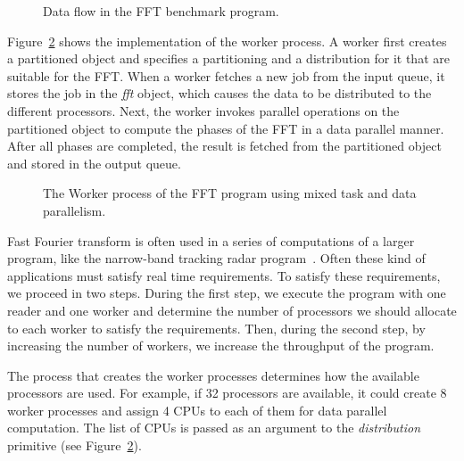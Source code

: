 \documentclass{article}
\begin{document}
\begin{figure}
  \begin{center}
  \end{center}
\caption{\label{fig:fft} {\small \sf Data flow in the FFT benchmark program.}}
\end{figure}


Figure~\ref{fig:worker} shows the implementation of the worker
process. A worker first creates a partitioned object and specifies a
partitioning and a distribution for it that are suitable for the FFT.
When a worker fetches a new job from the input queue, it stores the
job in the \emph{fft} object, which causes the data to be distributed
to the different processors. Next, the worker invokes parallel
operations on the partitioned object to compute the phases of the FFT
in a data parallel manner. After all phases are completed, the result
is fetched from the partitioned object and stored in the output queue.



\begin{figure}
  \begin{center}
  \end{center}
\caption{\label{fig:worker} {\small \sf The Worker process of the FFT
    program using mixed task and data parallelism.}}
\end{figure}

Fast Fourier transform is often used in a series of computations of a
larger program, like the narrow-band tracking radar
program~\cite{dinda94}. Often these kind of applications must satisfy
real time requirements. To satisfy these requirements, we proceed in
two steps.  During the first step, we execute the program with one
reader and one worker and determine the number of processors we should
allocate to each worker to satisfy the requirements. Then, during the
second step, by increasing the number of workers, we increase the
throughput of the program.

The process that creates the worker processes determines how the
available processors are used. For example, if 32 processors are
available, it could create 8 worker processes and assign 4 CPUs to
each of them for data parallel computation. The list of CPUs is passed
as an argument to the {\em distribution} primitive (see
Figure~\ref{fig:worker}).
\end{document}
